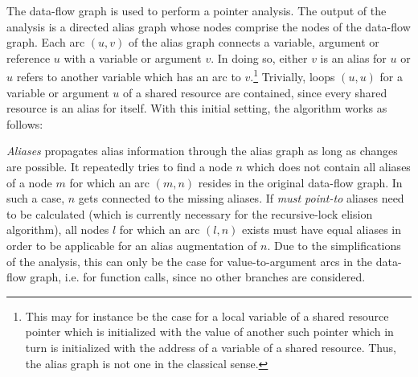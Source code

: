 The data-flow graph is used to perform a pointer analysis. The output of the analysis is a directed alias graph whose nodes comprise the nodes of the data-flow graph. Each arc $(u, v)$ of the alias graph connects a variable, argument or reference $u$ with a variable or argument $v$. In doing so, either $v$ is an alias for $u$ or $u$ refers to another variable which has an arc to $v$.\footnote{This may for instance be the case for a local variable of a shared resource pointer which is initialized with the value of another such pointer which in turn is initialized with the address of a variable of a shared resource. Thus, the alias graph is not one in the classical sense.} Trivially, loops $(u, u)$ for a variable or argument $u$ of a shared resource are contained, since every shared resource is an alias for itself. With this initial setting, the algorithm works as follows:

\vspace{4mm}

\textit{Aliases} propagates alias information through the alias graph as long as changes are possible. It repeatedly tries to find a node $n$ which does not contain all aliases of a node $m$ for which an arc $(m, n)$ resides in the original data-flow graph. In such a case, $n$ gets connected to the missing aliases. If \textit{must point-to} aliases need to be calculated (which is currently necessary for the recursive-lock elision algorithm), all nodes $l$ for which an arc $(l, n)$ exists must have equal aliases in order to be applicable for an alias augmentation of $n$. Due to the simplifications of the analysis, this can only be the case for value-to-argument arcs in the data-flow graph, i.e. for function calls, since no other branches are considered. 

